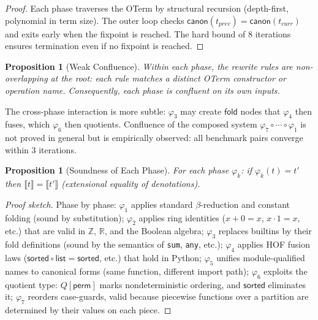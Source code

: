 \documentclass[11pt,a4paper]{report}
\theoremstyle{definition}
\theoremstyle{plain}
\newtheorem{proposition}[definition]{Proposition}
\newcommand{\den}[1]{\llbracket #1 \rrbracket}
\newcommand{\fold}{\mathsf{fold}}
\begin{document}
\begin{proof}
Each phase traverses the OTerm by structural recursion (depth-first,
polynomial in term size).  The outer loop checks
$\mathsf{canon}(t_{\mathit{prev}}) = \mathsf{canon}(t_{\mathit{curr}})$
and exits early when the fixpoint is reached.  The hard bound of 8
iterations ensures termination even if no fixpoint is reached.
\end{proof}

\begin{proposition}[Weak Confluence]
\label{prop:normalizer-confluence}
Within each phase, the rewrite rules are \emph{non-overlapping}
at the root: each rule matches a distinct OTerm constructor or
operation name.  Consequently, each phase is confluent on its own
inputs.
\end{proposition}

The cross-phase interaction is more subtle: $\varphi_3$ may create
$\fold$ nodes that $\varphi_4$ then fuses, which $\varphi_6$ then
quotients.  Confluence of the composed system $\varphi_7 \circ
\cdots \circ \varphi_1$ is not proved in general but is empirically
observed: all benchmark pairs converge within 3 iterations.

\begin{proposition}[Soundness of Each Phase]
\label{prop:phase-soundness}
For each phase $\varphi_k$: if $\varphi_k(t) = t'$ then
$\den{t} = \den{t'}$ (extensional equality of denotations).
\end{proposition}

\begin{proof}[Proof sketch]
Phase by phase:
$\varphi_1$ applies standard $\beta$-reduction and constant folding
(sound by substitution);
$\varphi_2$ applies ring identities ($x + 0 = x$, $x \cdot 1 = x$,
etc.) that are valid in $\mathbb{Z}$, $\mathbb{R}$, and the
Boolean algebra;
$\varphi_3$ replaces builtins by their fold definitions (sound by
the semantics of \texttt{sum}, \texttt{any}, etc.);
$\varphi_4$ applies HOF fusion laws ($\mathsf{sorted} \circ
\mathsf{list} = \mathsf{sorted}$, etc.) that hold in Python;
$\varphi_5$ unifies module-qualified names to canonical forms (same
function, different import path);
$\varphi_6$ exploits the quotient type: $Q[\mathsf{perm}]$ marks
nondeterministic ordering, and $\mathsf{sorted}$ eliminates it;
$\varphi_7$ reorders case-guards, valid because piecewise functions
over a partition are determined by their values on each piece.
\end{proof}


\end{document}
